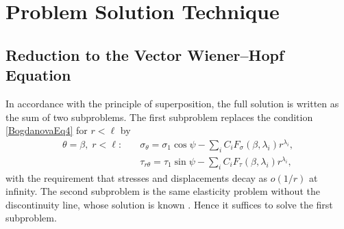 \section{Problem Solution Technique}
\label{BogdanovaSec3}

\subsection{Reduction to the Vector Wiener–Hopf Equation}

In accordance with the principle of superposition, the full solution is written as the sum of two subproblems.  The first subproblem replaces the condition \eqref{BogdanovaEq4} for $r<\ell$ by
\begin{equation}
	\begin{aligned}
		\theta=\beta,\;r<\ell:\quad
		&\sigma_{\theta}
		=\sigma_{1}\cos\psi
		-\sum_{i}C_{i} F_{\sigma}(\beta,\lambda_{i}) r^{\lambda_{i}},\\
		&\tau_{r\theta}
		=\tau_{1}\sin\psi
		-\sum_{i}C_{i} F_{\tau}(\beta,\lambda_{i}) r^{\lambda_{i}},
	\end{aligned}
	\label{BogdanovaEq7}
\end{equation}
with the requirement that stresses and displacements decay as $o(1/r)$ at infinity.  The second subproblem is the same elasticity problem without the discontinuity line, whose solution is known \cite{Bogdanova12,Bogdanova13}.  Hence it suffices to solve the first subproblem.

